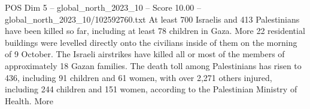 \begin{textsample}{POS Dim 5 – global\_north\_2023\_10 – Score 10.00 – global\_north\_2023\_10/102592760.txt}
At least 700 Israelis and 413 Palestinians have been killed so far, including at least 78 children in Gaza.
More 22 residential buildings were levelled directly onto the civilians inside of them on the morning of 9 October.
The Israeli airstrikes have killed all or most of the members of approximately 18 Gazan families.
The death toll among Palestinians has risen to 436, including 91 children and 61 women, with over 2,271 others injured, including 244 children and 151 women, according to the Palestinian Ministry of Health.
More

\end{textsample}
